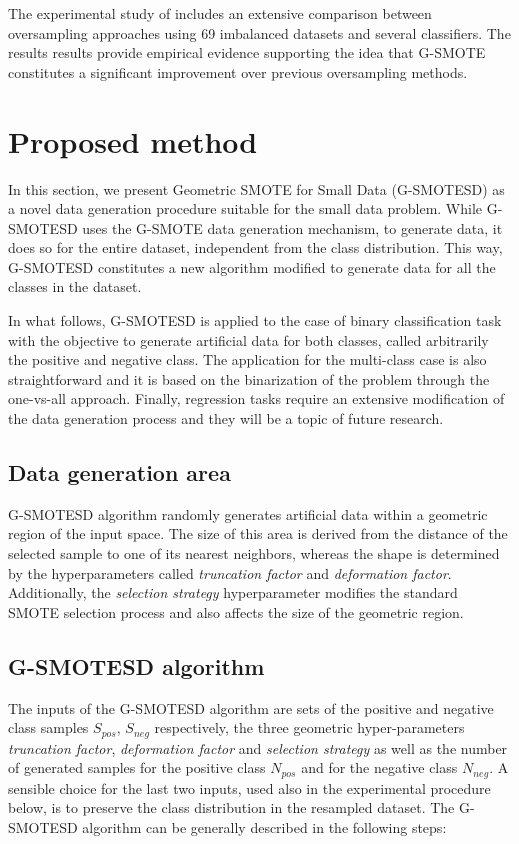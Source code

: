 \documentclass[parskip=full]{scrartcl}
\begin{document}
The experimental study of \cite{Douzas.2019} includes an extensive comparison between oversampling approaches using 69 imbalanced datasets and several classifiers. The results results provide empirical evidence supporting the idea that G-SMOTE constitutes a significant improvement over previous oversampling methods.

\section{Proposed method}
\label{proposed}

In this section, we present Geometric SMOTE for Small Data (G-SMOTESD) as a novel data generation procedure suitable for the small data problem. While G-SMOTESD uses the G-SMOTE data generation mechanism, to generate data, it does so for the entire dataset, independent from the class distribution. This way, G-SMOTESD constitutes a new algorithm modified to generate data for all the classes in the dataset.

In what follows, G-SMOTESD is applied to the case of binary classification task with the objective to generate artificial data for both classes, called
arbitrarily the positive and negative class. The application for the multi-class case is also straightforward and it is based on the binarization of the problem through the one-vs-all approach. Finally, regression tasks require an extensive modification of the data generation process and they will be a topic of future research.

\subsection{Data generation area}

G-SMOTESD algorithm randomly generates artificial data within a geometric region of the input space. The size of this area is derived from the distance of the selected sample to one of its nearest neighbors, whereas the shape is determined by the hyperparameters called \textit{truncation factor} and \textit{deformation factor}. Additionally, the \textit{selection strategy} hyperparameter modifies the standard SMOTE selection process and also affects the size of the geometric region.

\subsection{G-SMOTESD algorithm}
\label{algorithm}

The inputs of the G-SMOTESD algorithm are sets of the positive and negative class samples \( S_{pos} \), \( S_{neg} \) respectively, the three geometric hyper-parameters \textit{truncation factor}, \textit{deformation factor} and \textit{selection strategy} as well as the number of generated samples for the positive class \(N_{pos} \) and for the negative class \( N_{neg} \). A sensible choice for the last two inputs, used also in the experimental procedure below, is to preserve the class distribution in the resampled dataset. The G-SMOTESD algorithm can be generally described in the following steps:
\end{document}

